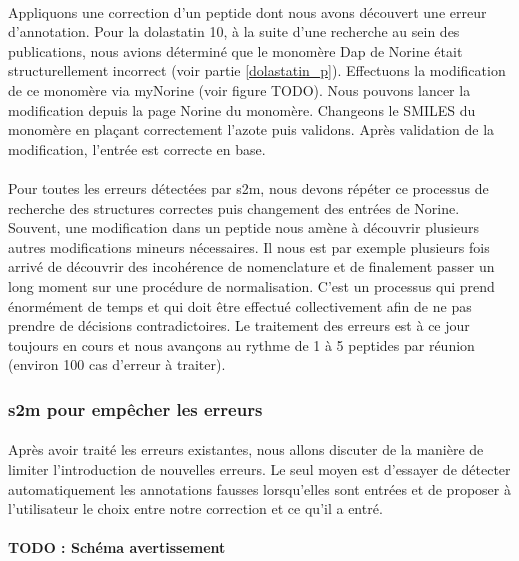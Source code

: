 \documentclass[12pt,french,twoside]{report}
\begin{document}
\paragraph{}Appliquons une correction d'un peptide dont nous avons découvert une erreur d'annotation.
Pour la dolastatin 10, à la suite d'une recherche au sein des publications, nous avions déterminé que le monomère Dap de Norine était structurellement incorrect (voir partie \ref{dolastatin_p}).
Effectuons la modification de ce monomère via myNorine (voir figure TODO).
Nous pouvons lancer la modification depuis la page Norine du monomère.
Changeons le SMILES du monomère en plaçant correctement l'azote puis validons.
Après validation de la modification, l'entrée est correcte en base.

\paragraph{}Pour toutes les erreurs détectées par s2m, nous devons répéter ce processus de recherche des structures correctes puis changement des entrées de Norine.
Souvent, une modification dans un peptide nous amène à découvrir plusieurs autres modifications mineurs nécessaires.
Il nous est par exemple plusieurs fois arrivé de découvrir des incohérence de nomenclature et de finalement passer un long moment sur une procédure de normalisation.
C'est un processus qui prend énormément de temps et qui doit être effectué collectivement afin de ne pas prendre de décisions contradictoires.
Le traitement des erreurs est à ce jour toujours en cours et nous avançons au rythme de 1 à 5 peptides par réunion (environ 100 cas d'erreur à traiter).


\subsubsection{s2m pour empêcher les erreurs}

\paragraph{}Après avoir traité les erreurs existantes, nous allons discuter de la manière de limiter l'introduction de nouvelles erreurs.
Le seul moyen est d'essayer de détecter automatiquement les annotations fausses lorsqu'elles sont entrées et de proposer à l'utilisateur le choix entre notre correction et ce qu'il a entré.

\paragraph{TODO : Schéma avertissement}
\end{document}
